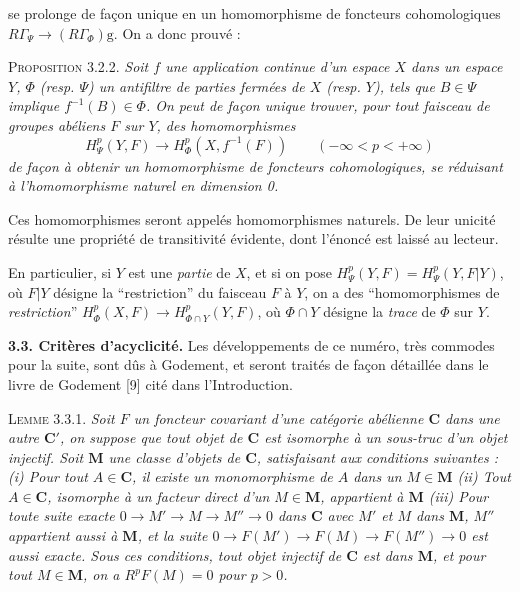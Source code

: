 
\noindent se prolonge de façon unique en un homomorphisme de foncteurs
cohomologiques
$R\Gamma_\Psi\to (R\Gamma_\Phi)\mathrm{g}$.
On a donc prouvé :

\indent\textsc{Proposition 3.2.2.} \textit{Soit $f$ une application continue
d'un espace $X$ dans un espace $Y$, $\Phi$ \textup{(}resp. $\Psi$\textup{)} un antifiltre de
parties fermées de $X$ \textup{(}resp. $Y$\textup{)}, tels que $B\in\Psi$ implique
$f^{-1}(B)\in\Phi$. On peut de façon unique trouver, pour tout faisceau de
groupes abéliens $F$ sur $Y$, des homomorphismes}
\[
H^p_\Psi(Y,F)\to H^p_\Phi(X,f^{-1}(F))
\qquad(-\infty<p<+\infty)
\]
\textit{de façon à obtenir un homomorphisme de foncteurs cohomologiques, se
réduisant à l'homomorphisme naturel en dimension \textup{0}.}

Ces homomorphismes seront appelés homomorphismes naturels. De leur unicité
résulte une propriété de transitivité évidente, dont l'énoncé est laissé au
lecteur.

En particulier, si $Y$ est une \textit{partie} de $X$, et si on pose
$H^p_\Psi(Y,F)=H^p_\Psi(Y,F\vert Y)$, où $F\vert Y$ désigne la
``restriction'' du faisceau $F$ à $Y$, on a des ``homomorphismes de
\textit{restriction}''
$H^p_\Phi(X,F)\to H^p_{\Phi\cap Y}(Y,F)$,
où $\Phi\cap Y$ désigne la \textit{trace} de $\Phi$ sur $Y$.

\indent\textbf{3.3. Critères d'acyclicité.} Les développements de ce numéro, très
commodes pour la suite, sont dûs à Godement, et seront traités de façon
détaillée dans le livre de Godement [9] cité dans l'Introduction.

\indent\textsc{Lemme 3.3.1.} \textit{Soit $F$ un foncteur covariant d'une
catégorie abélienne $\mathbf C$ dans une autre $\mathbf C'$, on suppose que tout objet de $\mathbf C$
est isomorphe à un sous-truc d'un objet injectif. Soit $\mathbf M$ une classe
d'objets de $\mathbf C$, satisfaisant aux conditions suivantes : \textup{(}i\textup{)} Pour tout
$A\in \mathbf C$, il existe un monomorphisme de $A$ dans un $M\in\mathbf M$ \textup{(}ii\textup{)} Tout
$A\in \mathbf C$, isomorphe à un facteur direct d'un $M\in\mathbf M$, appartient à
$\mathbf M$ \textup{(}iii\textup{)} Pour toute suite exacte
$0\to M'\to M\to M''\to0$
dans $\mathbf C$ avec $M'$ et $M$ dans $\mathbf M$, $M''$ appartient aussi à
$\mathbf M$, et la suite
$0\to F(M')\to F(M)\to
F(M'')\to0$ est aussi exacte. Sous ces conditions, tout objet
injectif de $\mathbf C$ est dans $\mathbf M$, et pour tout $M\in\mathbf M$, on a
$R^pF(M)=0$ pour $p>0$.}

